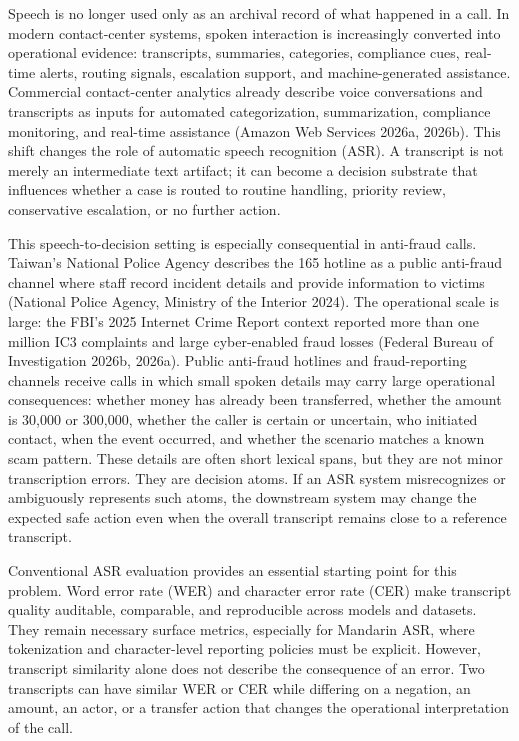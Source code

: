 \documentclass[
]{article}
\begin{document}
Speech is no longer used only as an archival record of what happened in
a call. In modern contact-center systems, spoken interaction is
increasingly converted into operational evidence: transcripts,
summaries, categories, compliance cues, real-time alerts, routing
signals, escalation support, and machine-generated assistance.
Commercial contact-center analytics already describe voice conversations
and transcripts as inputs for automated categorization, summarization,
compliance monitoring, and real-time assistance (Amazon Web Services
2026a, 2026b). This shift changes the role of automatic speech
recognition (ASR). A transcript is not merely an intermediate text
artifact; it can become a decision substrate that influences whether a
case is routed to routine handling, priority review, conservative
escalation, or no further action.

This speech-to-decision setting is especially consequential in
anti-fraud calls. Taiwan's National Police Agency describes the 165
hotline as a public anti-fraud channel where staff record incident
details and provide information to victims (National Police Agency,
Ministry of the Interior 2024). The operational scale is large: the
FBI's 2025 Internet Crime Report context reported more than one million
IC3 complaints and large cyber-enabled fraud losses (Federal Bureau of
Investigation 2026b, 2026a). Public anti-fraud hotlines and
fraud-reporting channels receive calls in which small spoken details may
carry large operational consequences: whether money has already been
transferred, whether the amount is 30,000 or 300,000, whether the caller
is certain or uncertain, who initiated contact, when the event occurred,
and whether the scenario matches a known scam pattern. These details are
often short lexical spans, but they are not minor transcription errors.
They are decision atoms. If an ASR system misrecognizes or ambiguously
represents such atoms, the downstream system may change the expected
safe action even when the overall transcript remains close to a
reference transcript.

Conventional ASR evaluation provides an essential starting point for
this problem. Word error rate (WER) and character error rate (CER) make
transcript quality auditable, comparable, and reproducible across models
and datasets. They remain necessary surface metrics, especially for
Mandarin ASR, where tokenization and character-level reporting policies
must be explicit. However, transcript similarity alone does not describe
the consequence of an error. Two transcripts can have similar WER or CER
while differing on a negation, an amount, an actor, or a transfer action
that changes the operational interpretation of the call.
\end{document}
